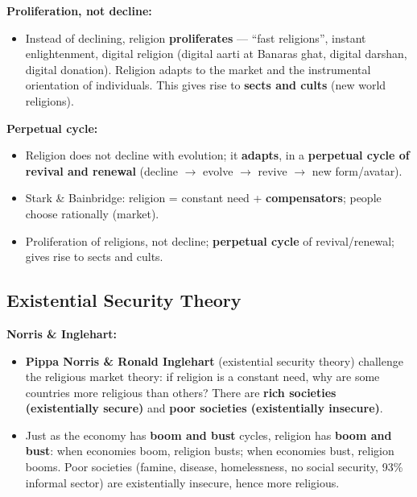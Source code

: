 \begin{ExampleBox}
\textbf{Proliferation, not decline:}
\begin{itemize}
\item Instead of declining, religion \textbf{proliferates} --- ``fast religions'', instant enlightenment, digital religion (digital aarti at Banaras ghat, digital darshan, digital donation). Religion adapts to the market and the instrumental orientation of individuals. This gives rise to \textbf{sects and cults} (new world religions).
\end{itemize}
\end{ExampleBox}

\begin{CriticalPoint}
\textbf{Perpetual cycle:}
\begin{itemize}
\item Religion does not decline with evolution; it \textbf{adapts}, in a \textbf{perpetual cycle of revival and renewal} (decline $\rightarrow$ evolve $\rightarrow$ revive $\rightarrow$ new form/avatar).
\end{itemize}
\end{CriticalPoint}

\begin{QuickRevision}
\begin{itemize}
\item Stark \& Bainbridge: religion = constant need + \textbf{compensators}; people choose rationally (market).
\item Proliferation of religions, not decline; \textbf{perpetual cycle} of revival/renewal; gives rise to sects and cults.
\end{itemize}
\end{QuickRevision}

\sectiondivider

\subsection{Existential Security Theory}

\begin{KeyConcept}
\textbf{Norris \& Inglehart:}
\begin{itemize}
\item \textbf{Pippa Norris \& Ronald Inglehart} (existential security theory) challenge the religious market theory: if religion is a constant need, why are some countries more religious than others? There are \textbf{rich societies (existentially secure)} and \textbf{poor societies (existentially insecure)}.
\item Just as the economy has \textbf{boom and bust} cycles, religion has \textbf{boom and bust}: when economies boom, religion busts; when economies bust, religion booms. Poor societies (famine, disease, homelessness, no social security, 93\% informal sector) are existentially insecure, hence more religious.
\end{itemize}
\end{KeyConcept}

